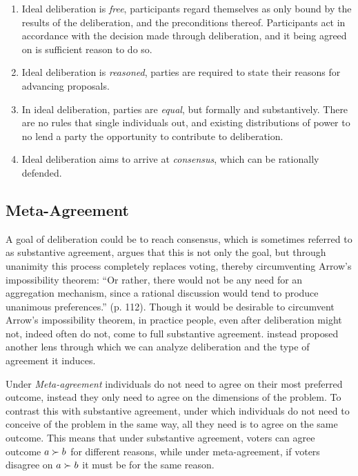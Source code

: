 \begin{enumerate}
	\label{list:ideal-deliberation}
	\setlength\itemsep{1px}
	\item  Ideal deliberation is \textit{free}, participants regard themselves as only bound by the results of the deliberation, and the preconditions thereof. Participants act in accordance with the decision made through deliberation, and it being agreed on is sufficient reason to do so.
	\item  Ideal deliberation is \textit{reasoned}, parties are required to state their reasons for advancing proposals.
	\item  In ideal deliberation, parties are \textit{equal}, but formally and substantively. There are no rules that single individuals out, and existing distributions of power to no lend a party the opportunity to contribute to deliberation.
	\item  Ideal deliberation aims to arrive at \textit{consensus}, which can be rationally defended.
\end{enumerate}

\subsection{Meta-Agreement}
\label{subsection:Meta-agreement}

A goal of deliberation could be to reach consensus, which is sometimes referred to as substantive agreement, \citet{elsterMARKETFORUMThree2002} argues that this is not only the goal, but through unanimity this process completely replaces voting, thereby circumventing Arrow's impossibility theorem: ``Or rather, there would not be any need for an aggregation mechanism, since a rational discussion would tend to produce unanimous preferences.” (p. 112). Though it would be desirable to circumvent Arrow's impossibility theorem, in practice people, even after deliberation might not, indeed often do not, come to full substantive agreement. \citet{listTwoConceptsAgreement2002} instead proposed another lens through which we can analyze deliberation and the type of agreement it induces.

Under \emph{Meta-agreement} individuals do not need to agree on their most preferred outcome, instead they only need to agree on the dimensions of the problem. To contrast this with substantive agreement, under which individuals do not need to conceive of the problem in the same way, all they need is to agree on the same outcome. This means that under substantive agreement, voters can agree outcome $a \succ b$ for different reasons, while under meta-agreement, if voters disagree on $a \succ b$ it must be for the same reason.

